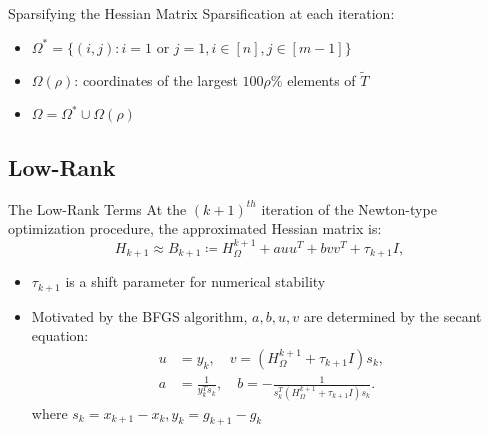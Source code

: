 \begin{frame}{Sparsifying the Hessian Matrix}
    Sparsification at each iteration:
    \begin{itemize}
        \item $\Omega^* = \{(i, j): i = 1 \text{ or } j = 1,i \in [n], j \in [m-1] \}$
        \item $\Omega(\rho)$: coordinates of the largest $100\rho\%$ elements of $\tilde{T}$
        \item $\Omega = \Omega^* \cup \Omega(\rho)$
    \end{itemize}
\end{frame}

\subsection{Low-Rank}
\begin{frame}{The Low-Rank Terms}
At the $(k+1)^{th}$ iteration of the Newton-type optimization procedure,
the approximated Hessian matrix is:
\begin{equation*}
\label{eq:BFGS-update}
    H_{k+1} \approx B_{k+1} \coloneqq H_{\Omega}^{k+1} + auu^T + bvv^T + \tau_{k+1} I,
\end{equation*}

\begin{itemize}
    \item $\tau_{k+1}$ is a shift parameter for numerical stability
    \item Motivated by the BFGS algorithm, $a, b, u, v$ are determined by the secant equation:
    \begin{align}
    \label{eq:secant-equation-solution}
        u & =y_{k},\quad v=(H_{\Omega}^{k+1}+\tau_{k+1}I)s_{k},\nonumber \\
        a & =\frac{1}{y_{k}^{T}s_{k}},\quad b=-\frac{1}{s_{k}^{T}(H_{\Omega}^{k+1}+\tau_{k+1}I)s_{k}}.
    \end{align}
    where $s_k = x_{k+1} - x_k, y_k = g_{k+1} - g_k$
\end{itemize}
\end{frame}